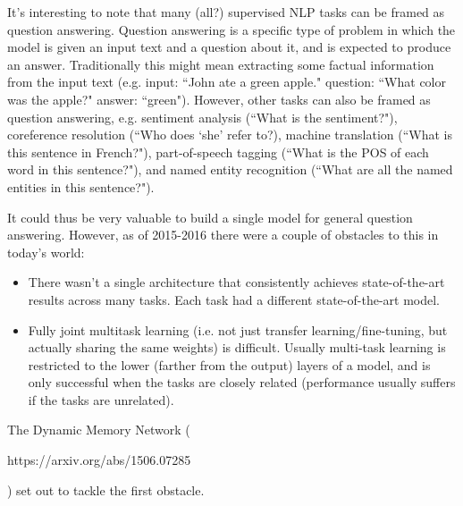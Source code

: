 It's interesting to note that many (all?) supervised NLP tasks can be framed as question answering. Question answering is a specific type of problem in which the model is given an input text and a question about it, and is expected to produce an answer. Traditionally this might mean extracting some factual information from the input text (e.g. input: ``John ate a green apple." question: ``What color was the apple?" answer: ``green"). However, other tasks can also be framed as question answering, e.g. sentiment analysis (``What is the sentiment?"), coreference resolution (``Who does `she' refer to?), machine translation (``What is this sentence in French?"), part-of-speech tagging (``What is the POS of each word in this sentence?"), and named entity recognition (``What are all the named entities in this sentence?").

It could thus be very valuable to build a single model for general question answering. However, as of 2015-2016 there were a couple of obstacles to this in today's world:
\begin{itemize}
\item There wasn't a single architecture that consistently achieves state-of-the-art results across many tasks. Each task had a different state-of-the-art model.
\item Fully joint multitask learning (i.e. not just transfer learning/fine-tuning, but actually sharing the same weights) is difficult. Usually multi-task learning is restricted to the lower (farther from the output) layers of a model, and is only successful when the tasks are closely related (performance usually suffers if the tasks are unrelated).
\end{itemize}

The Dynamic Memory Network (\begin{tt}https://arxiv.org/abs/1506.07285\end{tt}) set out to tackle the first obstacle.

